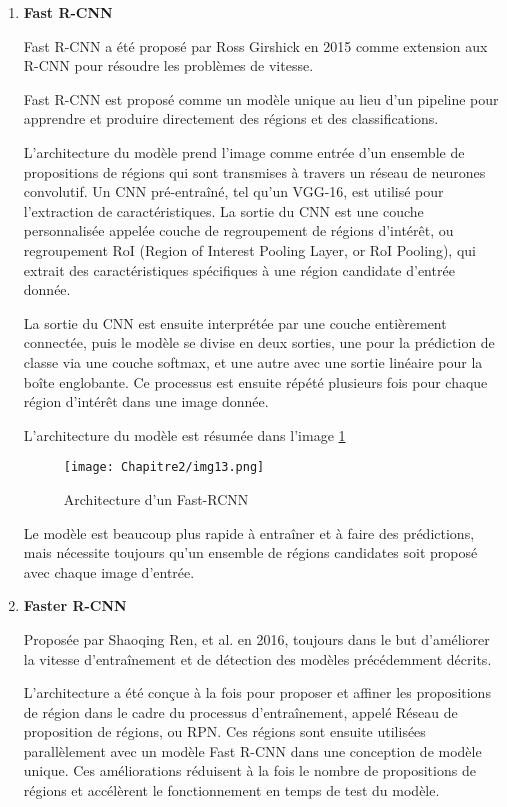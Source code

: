 \begin{enumerate}
 \item  \textbf{Fast R-CNN}\cite{fast_rcnn_paper}
 
Fast R-CNN a été proposé par Ross Girshick en 2015 comme extension aux R-CNN  pour résoudre les problèmes de vitesse.

Fast R-CNN est proposé comme un modèle unique au lieu d'un pipeline pour apprendre et produire directement des régions et des classifications.

L'architecture du modèle prend l'image comme entrée d'un ensemble de propositions de régions qui sont transmises à travers un réseau de neurones convolutif. Un CNN pré-entraîné, tel qu'un VGG-16, est utilisé pour l'extraction de caractéristiques. La sortie du CNN est une couche personnalisée appelée couche de regroupement de régions d'intérêt, ou regroupement RoI (Region of Interest Pooling Layer, or RoI Pooling), qui extrait des caractéristiques spécifiques à une région candidate d'entrée donnée. 

La sortie du CNN est ensuite interprétée par une couche entièrement connectée, puis le modèle se divise en deux sorties, une pour la prédiction de classe via une couche softmax, et une autre avec une sortie linéaire pour la boîte englobante. Ce processus est ensuite répété plusieurs fois pour chaque région d'intérêt dans une image donnée.

L'architecture du modèle est résumée dans l'image \ref{img13}

\begin{figure}[H]
          \centering
          \texttt{[image: Chapitre2/img13.png]}
          \caption{Architecture d'un Fast-RCNN \cite{fast_rcnn_paper}}
          \label{img13}
          \end{figure}

Le modèle est beaucoup plus rapide à entraîner et à faire des prédictions, mais nécessite toujours qu'un ensemble de régions candidates soit proposé avec chaque image d'entrée.

 \item  \textbf{Faster R-CNN}\cite{faster_rcnn_paper}
 
Proposée par Shaoqing Ren, et al. en 2016, toujours dans le but d'améliorer la vitesse d'entraînement et de détection des modèles précédemment décrits.

L'architecture a été conçue à la fois pour proposer et affiner les propositions de région dans le cadre du processus d'entraînement, appelé Réseau de proposition de régions, ou RPN. Ces régions sont ensuite utilisées parallèlement avec un modèle Fast R-CNN dans une conception de modèle unique. Ces améliorations réduisent à la fois le nombre de propositions de régions et accélèrent le fonctionnement en temps de test du modèle.


\end{enumerate}
